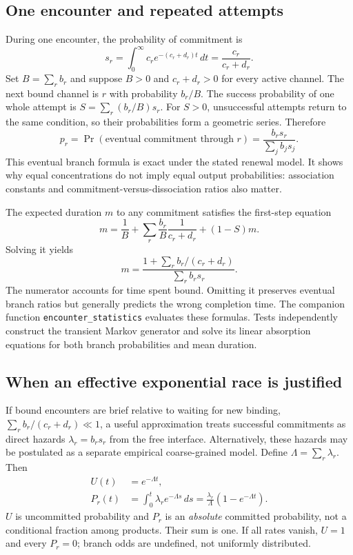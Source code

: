 \subsection{One encounter and repeated attempts}
During one encounter, the probability of commitment is
\begin{equation}
 s_r=\int_0^\infty c_r e^{-(c_r+d_r)t}\,dt
     =\frac{c_r}{c_r+d_r}.
\end{equation}
Set $B=\sum_r b_r$ and suppose $B>0$ and $c_r+d_r>0$ for every active
channel. The next bound channel is $r$ with probability $b_r/B$.
The success probability of one whole attempt is
$S=\sum_r(b_r/B)s_r$. For $S>0$, unsuccessful attempts return to the same
condition, so their probabilities form a geometric series. Therefore
\begin{equation}
 p_r=\Pr(\text{eventual commitment through }r)
 =\frac{b_rs_r}{\sum_j b_js_j}.
 \label{eq:branch}
\end{equation}
This eventual branch formula is exact under the stated renewal model.
It shows why equal concentrations do not imply equal output probabilities:
association constants and commitment-versus-dissociation ratios also matter.

The expected duration $m$ to any commitment satisfies the first-step equation
\[
 m=\frac1B+\sum_r\frac{b_r}{B}\frac1{c_r+d_r}+(1-S)m.
\]
Solving it yields
\begin{equation}
 m=\frac{1+\sum_r b_r/(c_r+d_r)}{\sum_r b_rs_r}.
 \label{eq:waiting}
\end{equation}
The numerator accounts for time spent bound. Omitting it preserves eventual
branch ratios but generally predicts the wrong completion time.
The companion function \texttt{encounter\_statistics} evaluates these formulas.
Tests independently construct the transient Markov generator and solve its
linear absorption equations for both branch probabilities and mean duration.

\subsection{When an effective exponential race is justified}
If bound encounters are brief relative to waiting for new binding,
$\sum_r b_r/(c_r+d_r)\ll1$, a useful approximation treats successful
commitments as direct hazards $\lambda_r=b_rs_r$ from the free interface.
Alternatively, these hazards may be postulated as a separate empirical
coarse-grained model. Define $\Lambda=\sum_r\lambda_r$. Then
\begin{align}
 U(t)&=e^{-\Lambda t},\\
 P_r(t)&=\int_0^t\lambda_r e^{-\Lambda s}\,ds
       =\frac{\lambda_r}{\Lambda}(1-e^{-\Lambda t}).
 \label{eq:race}
\end{align}
$U$ is uncommitted probability and $P_r$ is an \emph{absolute} committed
probability, not a conditional fraction among products. Their sum is one.
If all rates vanish, $U=1$ and every $P_r=0$; branch odds are undefined,
not uniformly distributed.

